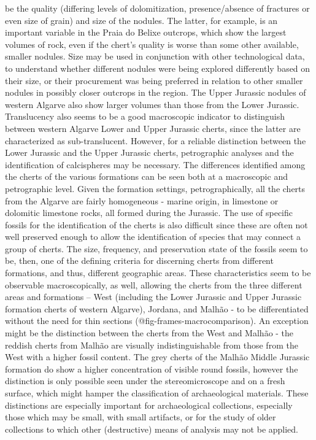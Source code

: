 \documentclass[
  a4paper,
  DIV=11,
  numbers=noendperiod]{scrreprt}
\begin{document}
be the quality (differing levels of dolomitization, presence/absence of
fractures or even size of grain) and size of the nodules. The latter,
for example, is an important variable in the Praia do Belixe outcrops,
which show the largest volumes of rock, even if the chert's quality is
worse than some other available, smaller nodules. Size may be used in
conjunction with other technological data, to understand whether
different nodules were being explored differently based on their size,
or their procurement was being preferred in relation to other smaller
nodules in possibly closer outcrops in the region. The Upper Jurassic
nodules of western Algarve also show larger volumes than those from the
Lower Jurassic. Translucency also seems to be a good macroscopic
indicator to distinguish between western Algarve Lower and Upper
Jurassic cherts, since the latter are characterized as sub-translucent.
However, for a reliable distinction between the Lower Jurassic and the
Upper Jurassic cherts, petrographic analyses and the identification of
calcispheres may be necessary. The differences identified among the
cherts of the various formations can be seen both at a macroscopic and
petrographic level. Given the formation settings, petrographically, all
the cherts from the Algarve are fairly homogeneous - marine origin, in
limestone or dolomitic limestone rocks, all formed during the Jurassic.
The use of specific fossils for the identification of the cherts is also
difficult since these are often not well preserved enough to allow the
identification of species that may connect a group of cherts. The size,
frequency, and preservation state of the fossils seem to be, then, one
of the defining criteria for discerning cherts from different
formations, and thus, different geographic areas. These characteristics
seem to be observable macroscopically, as well, allowing the cherts from
the three different areas and formations -- West (including the Lower
Jurassic and Upper Jurassic formation cherts of western Algarve),
Jordana, and Malhão - to be differentiated without the need for thin
sections (@fig-frames-macrocomparison). An exception might be the
distinction between the cherts from the West and Malhão - the reddish
cherts from Malhão are visually indistinguishable from those from the
West with a higher fossil content. The grey cherts of the Malhão Middle
Jurassic formation do show a higher concentration of visible round
fossils, however the distinction is only possible seen under the
stereomicroscope and on a fresh surface, which might hamper the
classification of archaeological materials. These distinctions are
especially important for archaeological collections, especially those
which may be small, with small artifacts, or for the study of older
collections to which other (destructive) means of analysis may not be
applied.
\end{document}
